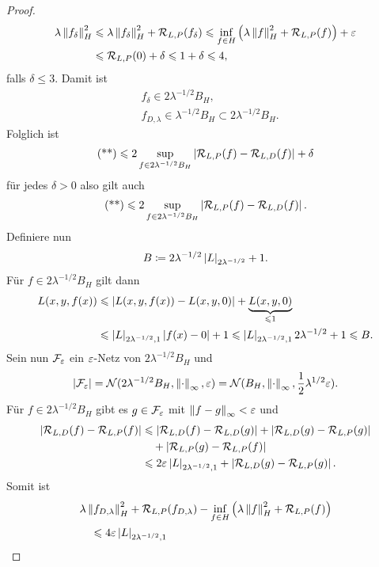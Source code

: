 \begin{proof}
\begin{align*}
\lambda\left\|f_\delta\right\|_H^2 &\leqslant \lambda\left\|f_\delta\right\|_H^2 + \mathcal{R}_{L,P}(f_\delta)
\leqslant \inf_{f\in H} \left(\lambda\left\|f\right\|_H^2 + \mathcal{R}_{L,P}(f) \right) + \varepsilon\\
&\leqslant \mathcal{R}_{L,P}(0) + \delta
\leqslant 1 + \delta \leqslant 4,
\end{align*}
falls $\delta \le 3$. Damit ist
\begin{align*}
&f_\delta \in 2\lambda^{-1/2}B_H,\\
&f_{D,\lambda}\in \lambda^{-1/2}B_H\subset 2\lambda^{-1/2}B_H.
\end{align*}
Folglich ist
\begin{align*}
\text{(**)} \leqslant 2\sup_{f\in 2\lambda^{-1/2}B_H} \left|\mathcal{R}_{L,P}(f)-\mathcal{R}_{L,D}(f)\right|
+ \delta
\end{align*}
für jedes $\delta > 0$ also gilt auch
\begin{align*}
\text{(**)} \leqslant 2\sup_{f\in 2\lambda^{-1/2}B_H} \left|\mathcal{R}_{L,P}(f)-\mathcal{R}_{L,D}(f)\right|.
\end{align*}
Definiere nun
\begin{align*}
B\coloneq 2\lambda^{-1/2}\left|L\right|_{2\lambda^{-1/2}} + 1.
\end{align*}
Für $f\in 2\lambda^{-1/2}B_H$ gilt dann
\begin{align*}
L(x,y,f(x)) &\leqslant \left|L(x,y,f(x))-L(x,y,0)\right| + \underbrace{L(x,y,0)}_{\leqslant 1}\\
&\leqslant \left|L\right|_{2\lambda^{-1/2},1}\left|f(x)-0\right| + 1
\leqslant \left|L\right|_{2\lambda^{-1/2},1}2\lambda^{-1/2} + 1
\leqslant B.
\end{align*}
Sein nun $\mathcal{F}_\varepsilon$ ein $\varepsilon$-Netz von $2\lambda^{-1/2}B_H$ und
\begin{align*}
\left|\mathcal{F}_\varepsilon\right| = \mathcal{N}(2\lambda^{-1/2}B_H,\left\|\cdot\right\|_\infty,\varepsilon) =
\mathcal{N}(B_H,\left\|\cdot\right\|_\infty,\frac{1}{2}\lambda^{1/2}\varepsilon).
\end{align*}
Für $f\in 2\lambda^{-1/2}B_H$ gibt es $g\in\mathcal{F}_\varepsilon$ mit $\left\|f-g\right\|_\infty <\varepsilon$
und
\begin{align*}
\left|\mathcal{R}_{L,D}(f)-\mathcal{R}_{L,P}(f)\right| &\leqslant
\left|\mathcal{R}_{L,D}(f)-\mathcal{R}_{L,D}(g)\right| + 
\left|\mathcal{R}_{L,D}(g)-\mathcal{R}_{L,P}(g)\right|\\
&\quad+ \left|\mathcal{R}_{L,P}(g)-\mathcal{R}_{L,P}(f)\right|\\
&\leqslant 2\varepsilon \left|L\right|_{2\lambda^{-1/2},1} + 
\left|\mathcal{R}_{L,D}(g)-\mathcal{R}_{L,P}(g)\right|.
\end{align*}
Somit ist
\begin{align*}
&\lambda \norm{f_{D,\lambda}}_H^2
+ \RR_{L,P}(f_{D,\lambda}) - \inf_{f\in H}
\left(\lambda\norm{f}_H^2 + \RR_{L,P}(f) \right)\\
&\quad \le 4\ep \abs{L}_{2\lambda^{-1/2},1}

\end{align*}
\end{proof}
